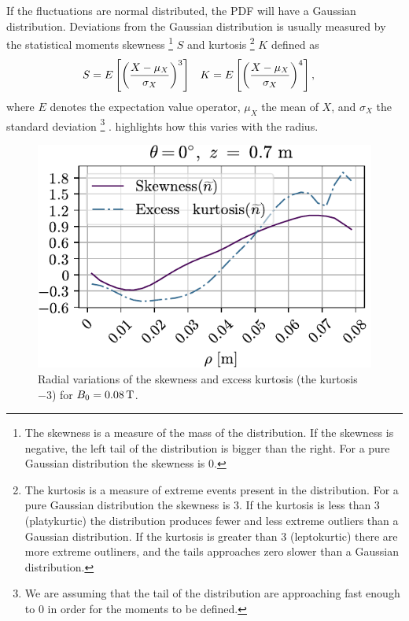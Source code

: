 If the fluctuations are normal distributed, the PDF will have a Gaussian distribution.
Deviations from the Gaussian distribution is usually measured by the statistical moments skewness%
%
\footnote{
    The skewness is a measure of the mass of the distribution.
    If the skewness is negative, the left tail of the distribution is bigger than the right.
    For a pure Gaussian distribution the skewness is 0.
}
%
$S$ and kurtosis%
%
\footnote{
    The kurtosis is a measure of extreme events present in the distribution.
    For a pure Gaussian distribution the skewness is 3.
    If the kurtosis is less than 3 (platykurtic) the distribution produces fewer and less extreme outliers than a Gaussian distribution.
    If the kurtosis is greater than 3 (leptokurtic) there are more extreme outliners, and the tails approaches zero slower than a Gaussian distribution.
}
%
$K$ defined as
%
\begin{align*}
    &S=E\left[\left(\frac{X - \mu_X}{\sigma_X}\right)^3\right]&
    &K=E\left[\left(\frac{X - \mu_X}{\sigma_X}\right)^4\right],
\end{align*}
%
where $E$ denotes the expectation value operator, $\mu_X$ the mean of $X$, and $\sigma_X$ the standard deviation%
\footnote{We are assuming that the tail of the distribution are approaching fast enough to $0$ in order for the moments to be defined.}%
.
 highlights how this varies with the radius.
%
\begin{figure}[htb]
    \centering
    \includegraphics{fig/results/skewKurt/008T}
    \caption{Radial variations of the skewness and excess kurtosis (the kurtosis $-3$) for $B_0 = 0.08\, \text{T}$.}
    \label{fig:skewKurt008}
\end{figure}
%

